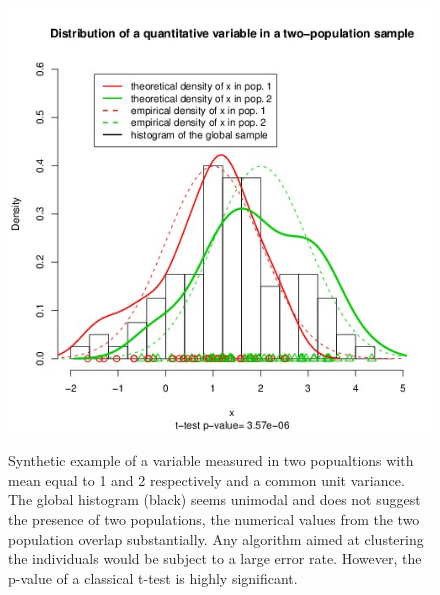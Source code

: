 \documentclass[a4paper,10pt]{article}
\begin{document}
\begin{figure}[h]
\includegraphics[height=12cm,width=17cm]{./fig/power.jpeg}
\caption{Synthetic example of a variable measured in two popualtions with mean equal to 1 and 2 respectively and a common unit variance. 
The global histogram (black) seems unimodal and does not suggest the presence of two populations, the numerical values 
from the two population overlap substantially. Any algorithm aimed at clustering the individuals 
would be subject to a large error rate. However, the p-value of a classical t-test is highly significant.}\label{fig:power}
\end{figure}
\end{document}
